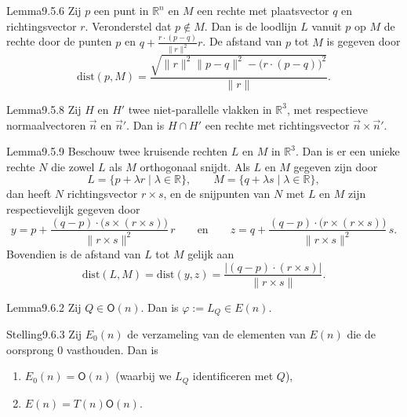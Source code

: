 \begin{res}{Lemma}{9.5.6}
Zij $p$ een punt in $\mathbb R^n$ en $M$ een rechte met plaatsvector $q$ en richtingsvector $r$. Veronderstel dat $p\notin M$. Dan is de loodlijn $L$ vanuit $p$ op $M$ de rechte door de punten $p$ en $q+\frac{r\cdot(p-q)}{\|r\|^2}r$. De afstand van $p$ tot $M$ is gegeven door
\[
\mathrm{dist}(p,M)=\frac{\sqrt{\|r\|^2\|p-q\|^2-\big(r\cdot(p-q)\big)^2}}{\|r\|}.
\]
\end{res}

\begin{res}{Lemma}{9.5.8}
Zij $H$ en $H'$ twee niet-parallelle vlakken in $\mathbb R^3$, met respectieve normaalvectoren $\vec n$ en $\vec n'$. Dan is $H\cap H'$ een rechte met richtingsvector $\vec n\times \vec n'$.
\end{res}

\begin{res}{Lemma}{9.5.9}
Beschouw twee kruisende rechten $L$ en $M$ in $\mathbb R^3$. Dan is er een unieke rechte $N$ die zowel $L$ als $M$ orthogonaal snijdt. Als $L$ en $M$ gegeven zijn door
\[
L=\{p+\lambda r \mid \lambda\in\mathbb R\}, \qquad M=\{q+\lambda s\mid \lambda\in\mathbb R\},
\]
dan heeft $N$ richtingsvector $r\times s$, en de snijpunten van $N$ met $L$ en $M$ zijn respectievelijk gegeven door
\[
y=p+\frac{(q-p)\cdot\big(s\times(r\times s)\big)}{\|r\times s\|^2}\,r \qquad\text{en}\qquad z=q+\frac{(q-p)\cdot\big(r\times(r\times s)\big)}{\|r\times s\|^2}\,s.
\]
Bovendien is de afstand van $L$ tot $M$ gelijk aan
\[
\mathrm{dist}(L,M)=\mathrm{dist}(y,z)=\frac{|(q-p)\cdot(r\times s)|}{\|r\times s\|}.
\]
\end{res}

\begin{res}{Lemma}{9.6.2}
Zij $Q\in \mathsf O(n)$. Dan is $\varphi:=L_Q\in E(n)$.
\end{res}

\begin{res}{Stelling}{9.6.3}
Zij $E_0(n)$ de verzameling van de elementen van $E(n)$ die de oorsprong $0$ vasthouden. Dan is
\begin{enumerate}[label=(\arabic*),leftmargin=1.8em,itemsep=1pt,topsep=1pt]
\item $E_0(n)=\mathsf O(n)$ (waarbij we $L_Q$ identificeren met $Q$),
\item $E(n)=T(n)\mathsf O(n)$.
\end{enumerate}
\end{res}